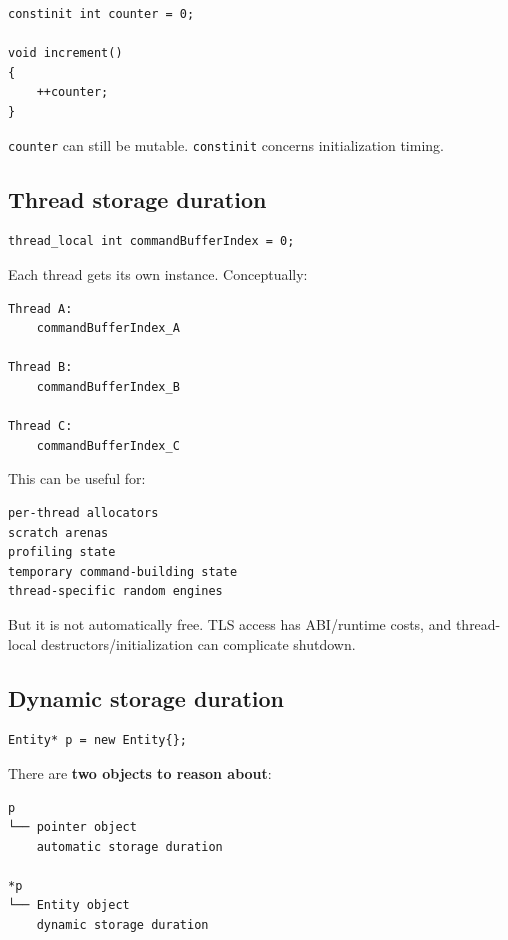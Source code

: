 \begin{verbatim}
constinit int counter = 0;

void increment()
{
    ++counter;
}
\end{verbatim}

\texttt{counter} can still be mutable. \texttt{constinit} concerns initialization timing.

\subsection{Thread storage duration}\label{05-engine-i-ch002-thread-storage-duration}

\begin{verbatim}
thread_local int commandBufferIndex = 0;
\end{verbatim}

Each thread gets its own instance. Conceptually:

\begin{verbatim}
Thread A:
    commandBufferIndex_A

Thread B:
    commandBufferIndex_B

Thread C:
    commandBufferIndex_C
\end{verbatim}

This can be useful for:

\begin{verbatim}
per-thread allocators
scratch arenas
profiling state
temporary command-building state
thread-specific random engines
\end{verbatim}

But it is not automatically free. TLS access has ABI/runtime costs, and thread-local destructors/initialization can complicate shutdown.

\subsection{Dynamic storage duration}\label{05-engine-i-ch002-dynamic-storage-duration}

\begin{verbatim}
Entity* p = new Entity{};
\end{verbatim}

There are \textbf{two objects to reason about}:

\begin{verbatim}
p
└── pointer object
    automatic storage duration

*p
└── Entity object
    dynamic storage duration
\end{verbatim}

